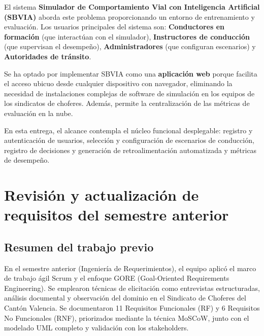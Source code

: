 \documentclass[12pt]{article}
\begin{document}
El sistema \textbf{Simulador de Comportamiento Vial con Inteligencia Artificial (SBVIA)} aborda este problema proporcionando un entorno de entrenamiento y evaluación. Los usuarios principales del sistema son: \textbf{Conductores en formación} (que interactúan con el simulador), \textbf{Instructores de conducción} (que supervisan el desempeño), \textbf{Administradores} (que configuran escenarios) y \textbf{Autoridades de tránsito}.

Se ha optado por implementar SBVIA como una \textbf{aplicación web} porque facilita el acceso ubicuo desde cualquier dispositivo con navegador, eliminando la necesidad de instalaciones complejas de software de simulación en los equipos de los sindicatos de choferes. Además, permite la centralización de las métricas de evaluación en la nube. 

En esta entrega, el alcance contempla el núcleo funcional desplegable: registro y autenticación de usuarios, selección y configuración de escenarios de conducción, registro de decisiones y generación de retroalimentación automatizada y métricas de desempeño.

\section{Revisión y actualización de requisitos del semestre anterior}
\subsection{Resumen del trabajo previo}
En el semestre anterior (Ingeniería de Requerimientos), el equipo aplicó el marco de trabajo ágil Scrum y el enfoque GORE (Goal-Oriented Requirements Engineering). Se emplearon técnicas de elicitación como entrevistas estructuradas, análisis documental y observación del dominio en el Sindicato de Choferes del Cantón Valencia. Se documentaron 11 Requisitos Funcionales (RF) y 6 Requisitos No Funcionales (RNF), priorizados mediante la técnica MoSCoW, junto con el modelado UML completo y validación con los stakeholders.
\end{document}
